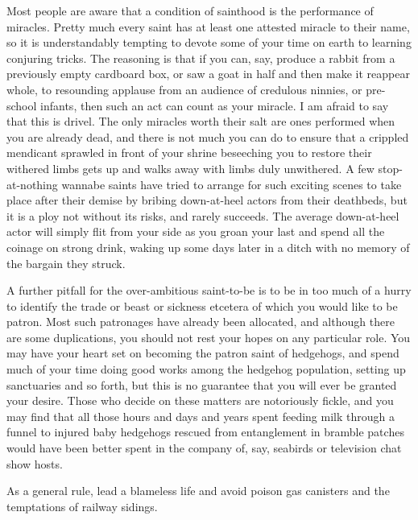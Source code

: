Most people are aware that a condition of sainthood is the performance of miracles. Pretty much every saint has at least one attested miracle to their name, so it is understandably tempting to devote some of your time on earth to learning conjuring tricks. The reasoning is that if you can, say, produce a rabbit from a previously empty cardboard box, or saw a goat in half and then make it reappear whole, to resounding applause from an audience of credulous ninnies, or pre-school infants, then such an act can count as your miracle. I am afraid to say that this is drivel. The only miracles worth their salt are ones performed when you are already dead, and there is not much you can do to ensure that a crippled mendicant sprawled in front of your shrine beseeching you to restore their withered limbs gets up and walks away with limbs duly unwithered. A few stop-at-nothing wannabe saints have tried to arrange for such exciting scenes to take place after their demise by bribing down-at-heel actors from their deathbeds, but it is a ploy not without its risks, and rarely succeeds. The average down-at-heel actor will simply flit from your side as you groan your last and spend all the coinage on strong drink, waking up some days later in a ditch with no memory of the bargain they struck.

A further pitfall for the over-ambitious saint-to-be is to be in too much of a hurry to identify the trade or beast or sickness etcetera of which you would like to be patron. Most such patronages have already been allocated, and although there are some duplications, you should not rest your hopes on any particular role. You may have your heart set on becoming the patron saint of hedgehogs, and spend much of your time doing good works among the hedgehog population, setting up sanctuaries and so forth, but this is no guarantee that you will ever be granted your desire. Those who decide on these matters are notoriously fickle, and you may find that all those hours and days and years spent feeding milk through a funnel to injured baby hedgehogs rescued from entanglement in bramble patches would have been better spent in the company of, say, seabirds or television chat show hosts.

As a general rule, lead a blameless life and avoid poison gas canisters and the temptations of railway sidings.